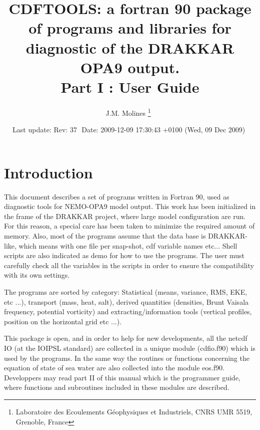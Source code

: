 \documentclass[a4paper,11pt]{article}
\begin{document}
\newcommand{\etal}{{\it et al.}}
\newcommand{\DegN}{$^{\circ}$N}
\newcommand{\DegW}{$^{\circ}$W}
\newcommand{\DegE}{$^{\circ}$E}
\newcommand{\DegS}{$^{\circ}$S}
\newcommand{\Deg}{$^{\circ}$}
\newcommand{\DegC}{$^{\circ}$C}
\newcommand{\DS}{ \renewcommand{\baselinestretch}{1.8} \tiny \normalsize}
\newcommand{\ST}{ \renewcommand{\baselinestretch}{1.2} \tiny \normalsize}
\newcommand{\ao}{add\_offset}
\newcommand{\SF}{scale\_factor}

\title{CDFTOOLS: a fortran 90 package of programs and libraries for diagnostic 
of the DRAKKAR OPA9 output.\\
Part I : User Guide }

\author{J.M. Molines  \thanks{Laboratoire des Ecoulements G\'eophysiques et Industriels, CNRS UMR 5519, Grenoble, France}\ }


\date{Last update: $ $Rev: 37 $ $ $ $Date: 2009-12-09 17:30:43 +0100 (Wed, 09 Dec 2009) $ $ }


\maketitle
\section*{Introduction}
This document describes a set of programs written in Fortran 90, used as diagnostic tools for 
NEMO-OPA9 model output. This work has been initialized in the frame of the DRAKKAR project, where 
large model configuration are run. For this reason, a special care has been taken to minimize the
required amount of memory. Also, most of the programs assume that the data base is DRAKKAR-like,
which means with one file per snap-shot, cdf variable names etc...  Shell scripts are also indicated
as demo for how to use the programs. The user must carefully check all the variables in the scripts in
order to ensure the compatibility with its own settings.

The programs are sorted by category: Statistical (means, variance, RMS, EKE, etc ...), transport (mass,
heat, salt), derived quantities (densities, Brunt Vaisala frequency, potential vorticity) and extracting/information tools
(vertical profiles, position on the horizontal grid etc ...).

This package is open, and in order to help for new developments, all the netcdf IO (at the IOIPSL standard) 
are collected in a unique  module (cdfio.f90) which is used by the programs. In the same way the routines or
functions concerning the equation of state of sea water are also collected into the module eos.f90.
Developpers may read part II of this manual which is the programmer guide, where
functions and subroutines included in these modules are described.
\end{document}
